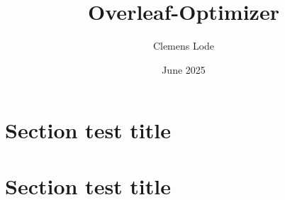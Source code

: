\documentclass{article}
\title{Overleaf-Optimizer}
\author{Clemens Lode}
\date{June 2025}
\begin{document}
\maketitle

\myfontfamilycopyright

\section{Section test title}

\lipsum[1-2]

\section{Section test title}

\lipsum[3-20]
\end{document}
